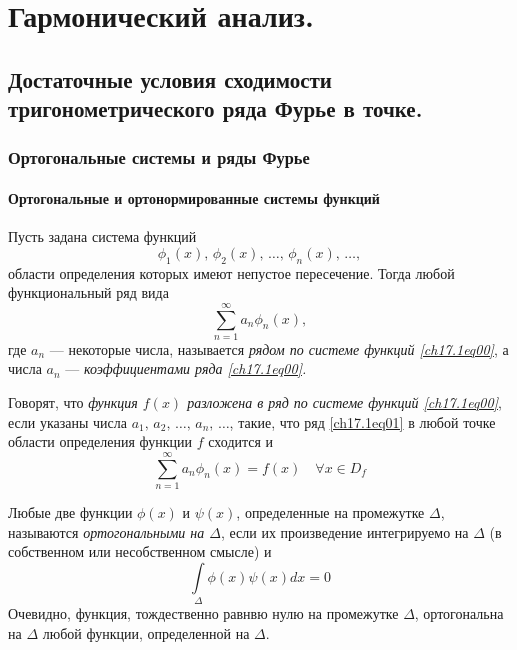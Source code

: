 \part[Гармонический анализ.]{Гармонический анализ.}%

\chapter{Достаточные условия сходимости тригонометрического ряда Фурье в точке.}
\section{Ортогональные системы и ряды Фурье}
\subsection{Ортогональные и ортонормированные системы функций}
Пусть задана система функций 
\begin{equation} \label{ch17.1eq00}
\phi_1(x), \,\phi_2(x), \, \ldots, \, \phi_n(x), \, \ldots,
\end{equation}
области определения которых имеют непустое пересечение. Тогда любой функциональный ряд вида
\begin{equation} \label{ch17.1eq01}
 \sum_{n = 1}^{\infty} a_n \phi_n(x),
 \end{equation}
 где $a_n$ --- некоторые числа, называется \textit{рядом по системе функций \eqref{ch17.1eq00}}, а числа $a_n$ --- \textit{коэффициентами ряда \eqref{ch17.1eq00}.}
 
 Говорят, что \textit{функция $f(x)$ разложена в ряд по системе функций \eqref{ch17.1eq00}}, если указаны числа $a_1, \,a_2, \,\ldots, \, a_n, \,\ldots$, такие, что ряд \eqref{ch17.1eq01} в любой точке области определения функции $f$ сходится и 
 $$
  \sum_{n = 1}^{\infty} a_n \phi_n(x)=f(x) \quad \forall x \in D_f
  $$ 



\begin{defn}
Любые две функции $\phi(x)$	и $\psi(x)$, определенные на промежутке $\Delta$, называются \textit{ортогональными на $\Delta$}, если их произведение интегрируемо на $\Delta$ (в собственном или несобственном смысле) и
$$
\int \limits_\Delta\phi(x) \psi(x)dx=0
$$
Очевидно, функция, тождественно равнвю нулю на промежутке $\Delta$, ортогональна на $\Delta$ любой функции, определенной на $\Delta$.
\end{defn}


